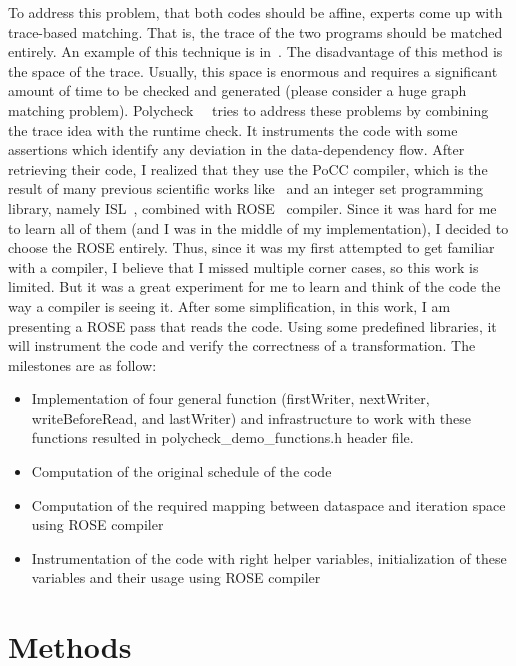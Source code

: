 \documentclass[letterpaper,12pt]{article}
\begin{document}
	To address this problem, that both codes should be affine, experts come up with trace-based matching. That is, the trace of the two programs should be matched entirely. An example of this technique is in~\cite{schordan2014verification}. The disadvantage of this method is the space of the trace. Usually, this space is enormous and requires a significant amount of time to be checked and generated (please consider a huge graph matching problem). Polycheck~~\cite{bao2016polycheck} tries to address these problems by combining the trace idea with the runtime check. It instruments the code with some assertions which identify any deviation in the data-dependency flow. After retrieving their code, I realized that they use the PoCC compiler, which is the result of many previous scientific works like~\cite{LOECHNER1999POLYLIB} and an integer set programming library, namely ISL~\cite{VERDOOLAEGE2010ISL}, combined with ROSE~\cite{quinlan2000rose} compiler. Since it was hard for me to learn all of them (and I was in the middle of my implementation), I decided to choose the ROSE entirely. Thus, since it was my first attempted to get familiar with a compiler, I believe that I missed multiple corner cases, so this work is limited. But it was a great experiment for me to learn and think of the code the way a compiler is seeing it. After some simplification, in this work, I am presenting a ROSE pass that reads the code. Using some predefined libraries, it will instrument the code and verify the correctness of a transformation. The milestones are as follow:
	
	\begin{itemize}
		\item Implementation of four general function (firstWriter, nextWriter, writeBeforeRead, and lastWriter) and infrastructure to work with these functions resulted in polycheck\_demo\_functions.h header file.
		\item Computation of the original schedule of the code~\cite{feautrier1992some}
		\item Computation of the required mapping between dataspace and iteration space using ROSE compiler
		\item Instrumentation of the code with right helper variables, initialization of these variables and their usage using ROSE compiler
	\end{itemize}
	
	
	
	\section{Methods}
	
\end{document}
